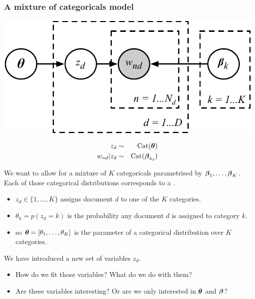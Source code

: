 \begin{frame}
\frametitle{A mixture of categoricals model}

\begin{minipage}{0.7\linewidth}
\centerline{\includegraphics[width=0.8\linewidth]{mix_categorical_model}}
\end{minipage}
\begin{minipage}{0.29\linewidth}
\begin{eqnarray*}
z_d & \sim & \rm{Cat}(\boldsymbol{\theta})\\
w_{nd} | z_d & \sim & \rm{Cat}(\boldsymbol{\beta}_{z_d})
\end{eqnarray*}
\end{minipage}

We want to allow for a mixture of $K$ categoricals parametrised by $\boldsymbol{\beta}_1,\ldots,\boldsymbol{\beta}_K$.\\
Each of those categorical distributions corresponds to a .
%
\begin{itemize}
\item $z_d\in\{1,\ldots,K\}$ assigns document $d$ to one of the $K$ categories.
\item $\theta_k = p(z_d=k)$ is the probability any document $d$ is assigned to category $k$.
\item so $\boldsymbol{\theta}=[\theta_1,\ldots,\theta_K]$ is the parameter of a
  categorical distribution over $K$ categories.
\end{itemize}
%
We have introduced a new set of  variables $z_d$.
\begin{itemize}
\item How do we fit those variables? What do we do with them?
\item Are these variables interesting? Or are we only interested in
  $\boldsymbol{\theta}$ and $\boldsymbol{\beta}$?
\end{itemize}

\end{frame}


